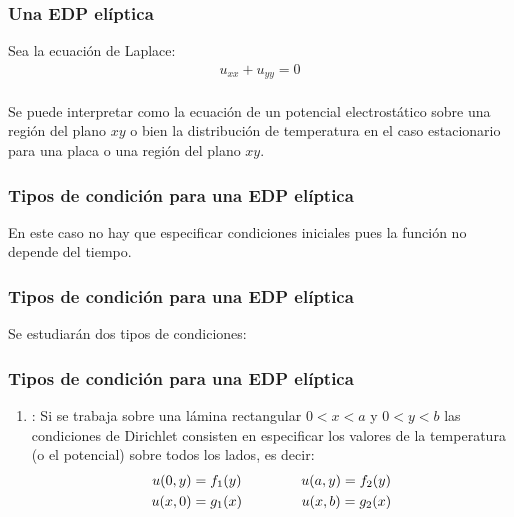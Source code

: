 \documentclass[12pt]{beamer}
\begin{document}
\begin{frame}
\frametitle{Una EDP elíptica}
Sea la ecuación de Laplace:
\pause
\begin{align*}
u_{xx} + u_{yy} = 0
\end{align*}
\\
\bigskip
\pause
Se puede interpretar como la ecuación de un potencial electrostático sobre una región del plano $xy$ o bien la distribución de temperatura en el caso estacionario para una placa o una región del plano $xy$.
\end{frame}
\begin{frame}
\frametitle{Tipos de condición para una EDP elíptica}
En este caso no hay que especificar condiciones iniciales pues la función no depende del tiempo.
\end{frame}
\begin{frame}
\frametitle{Tipos de condición para una EDP elíptica}
Se estudiarán dos tipos de condiciones:
\end{frame}
\begin{frame}
\frametitle{Tipos de condición para una EDP elíptica}
\begin{enumerate}[<+->]
\item {}: Si se trabaja sobre una lámina rectangular $0 < x < a$ y $0 < y < b$ las condiciones de Dirichlet consisten en especificar los valores de la temperatura (o el potencial) sobre todos los lados, es decir:
\begin{align}
\begin{aligned}
u (0, y) &= f_{1} (y) \hspace{1.5cm} u (a, y) = f_{2} (y) \\
u (x, 0) &= g_{1} (x) \hspace{1.5cm} u (x, b) = g_{2} (x)
\end{aligned}
\label{eq:ecuacion_06_02_05}
\end{align}
\seti
\end{enumerate}
\end{frame}
\end{document}
